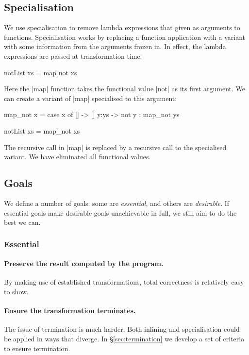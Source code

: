 \documentclass[preprint]{sigplanconf}
\begin{document}
\subsection{Specialisation}

We use specialisation to remove lambda expressions that given as arguments to functions. Specialisation works by replacing a function application with a variant with some information from the arguments frozen in. In effect, the lambda expressions are passed at transformation time.

\begin{example}
\begin{code}
notList xs = map not xs
\end{code}

\noindent Here the |map| function takes the functional value |not| as its first argument. We can create a variant of |map| specialised to this argument:

\begin{code}
map_not x = case  x of
                  []    -> []
                  y:ys  -> not y : map_not ys

notList xs = map_not xs
\end{code}

\noindent The recursive call in |map| is replaced by a recursive call to the specialised variant. We have eliminated all functional values.
\end{example}

\subsection{Goals}
\label{sec:goals}

We define a number of goals: some are \textit{essential}, and others are \textit{desirable}. If essential goals make desirable goals unachievable in full, we still aim to do the best we can.

\subsubsection*{Essential}

\paragraph{Preserve the result computed by the program.} By making use of established transformations, total correctness is relatively easy to show.

\paragraph{Ensure the transformation terminates.} The issue of termination is much harder. Both inlining and specialisation could be applied in ways that diverge. In \S\ref{sec:termination} we develop a set of criteria to ensure termination.
\end{document}
